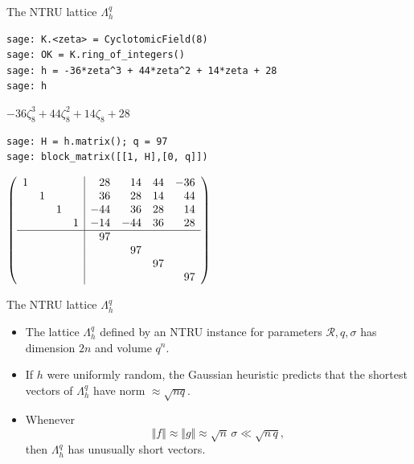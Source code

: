 \documentclass[presentation,smaller]{beamer}
\newcommand{\cR}{\ensuremath{\mathcal{R}}\xspace}
\begin{document}
\begin{frame}[fragile,label={sec:org5dbd065}]{The NTRU lattice \(\Lambda^q_h\)}
 \lstset{language=sage,label= ,caption= ,captionpos=b,numbers=none}
\begin{lstlisting}
sage: K.<zeta> = CyclotomicField(8)
sage: OK = K.ring_of_integers()
sage: h = -36*zeta^3 + 44*zeta^2 + 14*zeta + 28
sage: h
\end{lstlisting}

\(-36 \zeta_{8}^{3} + 44 \zeta_{8}^{2} + 14 \zeta_{8} + 28\)


\lstset{language=sage,label= ,caption= ,captionpos=b,numbers=none}
\begin{lstlisting}
sage: H = h.matrix(); q = 97
sage: block_matrix([[1, H],[0, q]])
\end{lstlisting}

\begin{small}
\(\left(\begin{array}{rrrr|rrrr}
1 &   &   &   & 28 & 14 & 44 & -36 \\
  & 1 &   &   & 36 & 28 & 14 & 44 \\
  &   & 1 &   & -44 & 36 & 28 & 14 \\
  &   &   & 1 & -14 & -44 & 36 & 28 \\
\hline
   &   &   &   & 97 &   &   &   \\
  &   &   &   &   & 97 &   &   \\
  &   &   &   &   &   & 97 &   \\
  &   &   &   &   &   &   & 97
\end{array}\right)\)
\end{small}
\end{frame}

\begin{frame}[label={sec:org5152ed0}]{The NTRU lattice \(\Lambda^q_h\)}
\begin{itemize}
\item The lattice \(\Lambda^q_h\) defined by an NTRU instance for parameters \(\cR, q, σ\) has dimension \(2n\) and volume \(q^n\).
\item If \(h\) were uniformly random, the Gaussian heuristic predicts that the shortest vectors of \(\Lambda_h^q\) have norm \(≈ \sqrt{n q}\).
\item Whenever \[\Vert f \Vert ≈ \Vert g \Vert ≈ \sqrt{n}\,σ \ll \sqrt{n\,q},\] then \(\Lambda^q_h\) has \alert{unusually short vectors}.
\end{itemize}
\end{frame}
\end{document}
